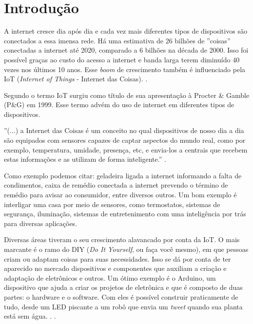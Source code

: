 \chapter{Introdução}\label{cap:introducao}

A internet cresce dia após dia e cada vez mais diferentes tipos de dispositivos são conectados a essa imensa rede. Há uma estimativa de 26 bilhões de ''coisas'' conectadas a internet até 2020, comparado a 6 bilhões na década de 2000. Isso foi possível graças ao custo do acesso a internet e banda larga terem diminuído 40 vezes nos últimos 10 anos. Esse \textit{boom} de crescimento também é influenciado pela IoT (\textit{Internet of Things} - Internet das Coisas). \cite{goldmansachs-iot}. 

Segundo  o termo IoT surgiu como título de sua apresentação à Procter \& Gamble (P\&G) em 1999. Esse termo advém do uso de internet em diferentes tipos de dispositivos. 

\begin{citacao}
''(...) a Internet das Coisas é um conceito no qual dispositivos de nosso dia a dia são equipados com sensores capazes de captar aspectos do mundo real, como por exemplo, temperatura, umidade, presença, etc, e envia-los a centrais que recebem estas informações e as utilizam de forma inteligente.'' \cite{nascimento-iot}.
\end{citacao}

Como exemplo podemos citar: geladeira ligada a internet informando a falta de condimentos, caixa de remédio conectada a internet prevendo o término de remédio para avisar ao consumidor, entre diversos outros. Um bom exemplo é interligar uma casa por meio de sensores, como termostatos, sistemas de segurança, iluminação, sistemas de entretenimento com uma inteligência por trás para diversas aplicações. \cite{goldmansachs-iot}

Diversas áreas tiveram o seu crescimento alavancado por conta da IoT. O mais marcante é o ramo do DIY (\textit{Do It Yourself}, ou faça você mesmo), em que pessoas criam ou adaptam coisas para suas necessidades. Isso se dá por conta de ter aparecido no mercado dispositivos e componentes que auxiliam a criação e adaptação de eletrônicos e outros. Um ótimo exemplo é o Arduino, um dispositivo que ajuda a criar os projetos de eletrônica e que é composto de duas partes: o hardware e o software. Com eles é possível construir praticamente de tudo, desde um LED piscante a um robô que envia um \textit{tweet} quando sua planta está sem água. \cite{ben-arduino}. \cite{sorrel-arduino}.


